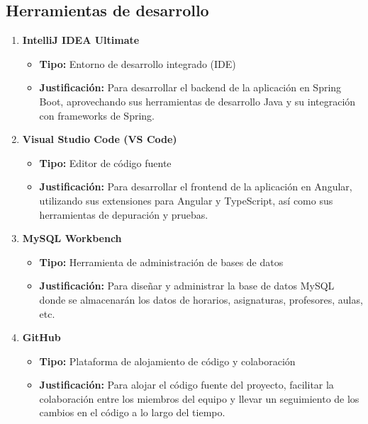 \documentclass[12pt]{article} %
\begin{document}
\subsection{Herramientas de desarrollo}
\begin{enumerate}[font=\bfseries]
    \item \textbf{IntelliJ IDEA Ultimate}
    \begin{itemize}
        \item \textbf{Tipo:} Entorno de desarrollo integrado (IDE)
        \item \textbf{Justificación:} Para desarrollar el backend de la aplicación en Spring Boot, aprovechando sus herramientas de desarrollo Java y su integración con frameworks de Spring.
    \end{itemize}
    
    \item \textbf{Visual Studio Code (VS Code)}
    \begin{itemize}
        \item \textbf{Tipo:} Editor de código fuente
        \item \textbf{Justificación:} Para desarrollar el frontend de la aplicación en Angular, utilizando sus extensiones para Angular y TypeScript, así como sus herramientas de depuración y pruebas.
    \end{itemize}
    
    \item \textbf{MySQL Workbench}
    \begin{itemize}
        \item \textbf{Tipo:} Herramienta de administración de bases de datos
        \item \textbf{Justificación:} Para diseñar y administrar la base de datos MySQL donde se almacenarán los datos de horarios, asignaturas, profesores, aulas, etc.
    \end{itemize}
    
    \item \textbf{GitHub}
    \begin{itemize}
        \item \textbf{Tipo:} Plataforma de alojamiento de código y colaboración
        \item \textbf{Justificación:} Para alojar el código fuente del proyecto, facilitar la colaboración entre los miembros del equipo y llevar un seguimiento de los cambios en el código a lo largo del tiempo.
    \end{itemize}
    

\end{enumerate}
\end{document}
